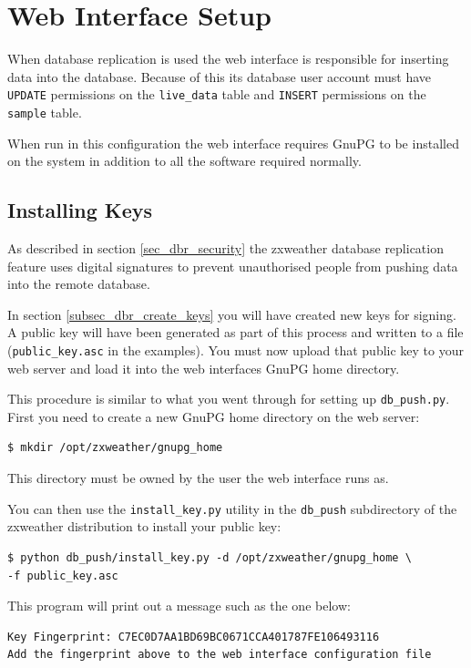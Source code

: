 \documentclass[a4paper,10pt,draft]{book}
\begin{document}
\section{Web Interface Setup}

When database replication is used the web interface is responsible for inserting data into the database. Because of this its database user account must have \verb|UPDATE| permissions on the \verb|live_data| table and \verb|INSERT| permissions on the \verb|sample| table.

When run in this configuration the web interface requires GnuPG to be installed on the system in addition to all the software required normally.

\subsection{Installing Keys}
\label{sec_dbr_installing_keys}
As described in section \ref{sec_dbr_security} the zxweather database replication feature uses digital signatures to prevent unauthorised people from pushing data into the remote database.

In section \ref{subsec_dbr_create_keys} you will have created new keys for signing. A public key will have been generated as part of this process and written to a file (\verb|public_key.asc| in the examples). You must now upload that public key to your web server and load it into the web interfaces GnuPG home directory.

This procedure is similar to what you went through for setting up \verb|db_push.py|. First you need to create a new GnuPG home directory on the web server:
\begin{verbatim}
$ mkdir /opt/zxweather/gnupg_home
\end{verbatim}

This directory must be owned by the user the web interface runs as.

You can then use the \verb|install_key.py| utility in the \verb|db_push| subdirectory of the zxweather distribution to install your public key:

\begin{verbatim}
$ python db_push/install_key.py -d /opt/zxweather/gnupg_home \
-f public_key.asc
\end{verbatim}

This program will print out a message such as the one below:
\begin{verbatim}
Key Fingerprint: C7EC0D7AA1BD69BC0671CCA401787FE106493116
Add the fingerprint above to the web interface configuration file
\end{verbatim}
\end{document}
